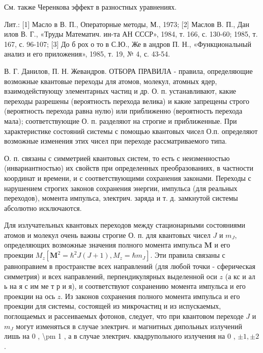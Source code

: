\documentclass[10pt]{article}
\begin{document}
См. также Черенкова эффект в разностных уравнениях.



Лит.: [1] Масло в В. П., Операторные методы, М., 1973; [2] Маслов В. П., Дан илов В. Г., «Труды Математич. ин-та АН СССР», 1984, т. 166, с. 130-60; 1985, т. 167, с. 96-107; [3] До б рох о то в С.Ю., Же в андров П. Н., «Функциональный анализ и его приложения», 1985, т. 19, № 4, с. 43-54.



В. Г. Данилов, П. Н. Жевандров. ОТБОРА ПРАВИЛА - правила, определяющие возможные квантовые переходы для атомов, молекул, атомных ядер, взаимодействующу элементарных частиц и др. О. п. устанавливают, какие переходы разрешены (вероятность перехода велика) и какие запрещены строго (вероятность перехода равна нулю) или приближенно (вероятность перехода мала); соответствующие О. п. разделяют на строгие и приближенные. При характеристике состояний системы с помощью квантовых чисел О.п. определяют возможные изменения этих чисел при переходе рассматриваемого типа.



О. п. связаны с симметрией квантовых систем, то есть с неизменностью (инвариантностью) их свойств при определенных преобразованиях, в частности координат и времени, и с соответствующими сохранения законами. Переходы с нарушением строгих законов сохранения энергии, импульса (для реальных переходов), момента импульса, электрич. заряда и т. д. замкнутой системы абсолютно исключаются.



Для излучательных квантовых переходов между стационарными состояниями атомов и молекул очень важны строгие О. п. для квантовых чисел $J$ и $m_{J}$, определяющих возможные значения полного момента импульса $\boldsymbol{M}$ и его проекции $M_{z}\left[\boldsymbol{M}^{2}=\hbar^{2} J(J+1), M_{z}=\hbar m_{J}\right]$. Эти правила связаны с равноправием в пространстве всех направлений (для любой точки - сферическая симметрия) и всех направлений, перпендикулярных выделенной оси $z$ (а кс и ал ь на я с им ме т р и я), и соответствуют сохранению момента импульса и его проекции на ось $z$. Из законов сохранения полного момента импульса и его проекции для системы, состоящей из микрочастиц и из испускаемых, поглощаемых и рассеиваемых фотонов, следует, что при квантовом переходе $J$ и $m_{J}$ могут изменяться в случае электрич. и магнитных дипольных излучений лишь на 0 , \textbackslash pm 1 , а в случае электрич. квадрупольного излучения на 0 , $\pm 1, \pm 2$.
\end{document}
